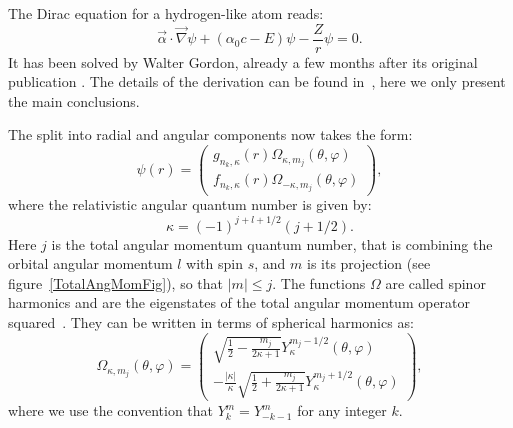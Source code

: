 The Dirac equation for a hydrogen-like atom reads:
\begin{equation}
	\vec{\alpha} \cdot \vec{\nabla} \psi + (\alpha_0 c - E) \psi - \frac{Z}{r}\psi = 0.
\end{equation}
It has been solved by Walter Gordon, already a few months after its original publication \cite{Gordon1928}. The details of the derivation can be found in~\cite{DiracStory}, here we only present the main conclusions.

The split into radial and angular components now takes the form:
\begin{equation} \label{Diracwave}
	\psi(r) = \left(\begin{matrix}g_{n_k,\kappa}(r) \Omega_{\kappa,m_j}(\theta,\varphi) \\ f_{n_k,\kappa}(r) \Omega_{-\kappa,m_j}(\theta,\varphi)\end{matrix}\right),
\end{equation}
where the relativistic angular quantum number is given by:
\begin{equation}\label{eq:kappa}
	\kappa = (-1)^{j+l+1/2}(j+1/2).
\end{equation}
Here $j$ is the total angular momentum quantum number, that is combining the orbital angular momentum $l$ with spin $s$, and $m$ is its projection (see figure~\ref{TotalAngMomFig}), so that $|m| \leq j$. The functions $\Omega$ are called spinor harmonics and are the eigenstates of the total angular momentum operator squared~\cite{biedenharn1984angular}. They can be written in terms of spherical harmonics as:
\begin{equation}
	 \Omega_{\kappa,m_j}(\theta,\varphi) = \left(\begin{matrix}\sqrt{\frac{1}{2}-\frac{m_j}{2\kappa+1}}Y^{m_j-1/2}_{\kappa}(\theta,\varphi) \\ -\frac{|\kappa|}{\kappa}\sqrt{\frac{1}{2}+\frac{m_j}{2\kappa+1}}Y^{m_j+1/2}_{\kappa}(\theta,\varphi)\end{matrix}\right),
 \end{equation}
where we use the convention that $Y_{k}^m = Y_{-k-1}^m$  for any integer $k$.

